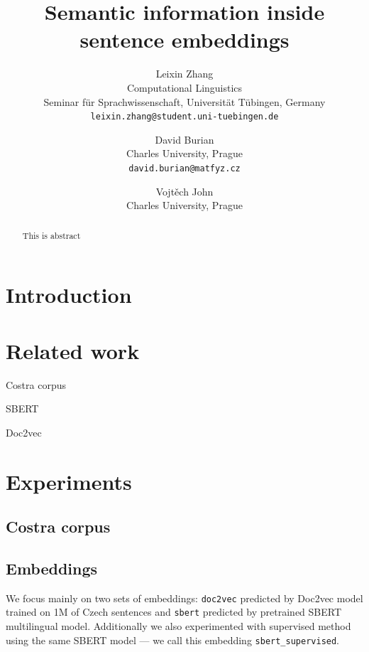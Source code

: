 \documentclass[11pt]{article}
\title{Semantic information inside sentence embeddings}
\author{Leixin Zhang \\ 
    Computational Linguistics\\
    Seminar für Sprachwissenschaft,
    Universität Tübingen, Germany \\ 
    \texttt{leixin.zhang@student.uni-tuebingen.de}
    }
\author{David Burian\\
  Charles University, Prague\\
  \texttt{david.burian@matfyz.cz}
  }
\author{Vojtěch John\\
 Charles University, Prague\\
 }
\newcommand{\Embed}[1]{\texttt{#1}}
\begin{document}
\maketitle

\begin{abstract}
This is abstract
\end{abstract}

\section{Introduction}

\section{Related work}

Costra corpus~\cite{baranvcikova2020costra}

SBERT~\cite{reimers2019sentence}

Doc2vec~\cite{le2014distributed}


\section{Experiments}

\subsection{Costra corpus}


\subsection{Embeddings}\label{sec:embeddings}

We focus mainly on two sets of embeddings: \Embed{doc2vec} predicted by Doc2vec
model trained on 1M of Czech sentences and \Embed{sbert} predicted by
pretrained SBERT multilingual model. Additionally we also experimented with
supervised method using the same SBERT model --- we call this embedding
\Embed{sbert\_supervised}.
\end{document}

